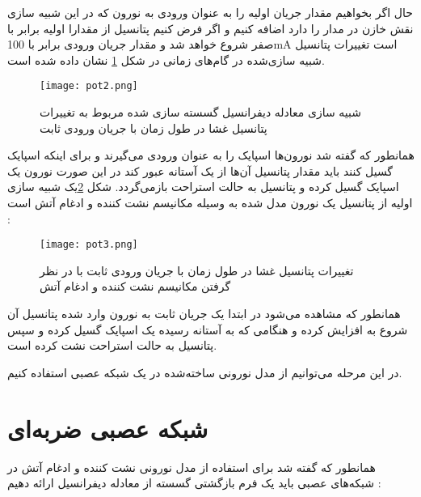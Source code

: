   حال اگر بخواهیم مقدار جریان اولیه را به عنوان ورودی به نورون که در این شبیه سازی نقش خازن در مدار را دارد اضافه کنیم و اگر فرض کنیم پتانسیل از مقدارا اولیه برابر با صفر شروع خواهد شد و مقدار جریان ورودی برابر با 100mA است تغییرات پتانسیل شبیه سازی‌شده در گام‌های زمانی در شکل \ref{fig:neuron9} نشان داده شده است.
   \begin{figure}[htbp]
  	\centering
  	\texttt{[image: pot2.png]}
  	\captionsetup{font=small} %
  	\caption{شبیه سازی معادله دیفرانسیل گسسته سازی شده مربوط به تغییرات پتانسیل غشا در طول  زمان با جریان ورودی ثابت}
  	\label{fig:neuron9}
  \end{figure}
% 
% 
% 

 همانطور که گفته شد نورون‌ها اسپایک را به عنوان ورودی می‌گیرند و برای اینکه اسپایک گسیل کنند باید مقدار پتانسیل آن‌ها از یک آستانه عبور کند در این صورت نورون یک اسپایک گسیل کرده و پتانسیل به حالت استراحت باز‌می‌گردد.
شکل \ref{fig:neuron10}یک شبیه سازی اولیه از پتانسیل یک نورون مدل شده به وسیله مکانیسم نشت کننده و ادغام آتش است :
 
  \begin{figure}[htbp]
 	\centering
 	\texttt{[image: pot3.png]}
 	\captionsetup{font=small} %
 	\caption{تغییرات پتانسیل غشا در طول  زمان با جریان ورودی ثابت با در نظر گرفتن مکانیسم نشت کننده و ادغام آتش }
 	\label{fig:neuron10}
 \end{figure}
 
 همانطور که مشاهده می‌شود در ابتدا یک جریان ثابت به نورون وارد شده پتانسیل آن شروع به افزایش کرده و هنگامی که به آستانه رسیده یک اسپایک گسیل کرده و سپس پتانسیل به حالت استراحت نشت کرده است.
 
 
 
 در این مرحله می‌توانیم از مدل نورونی ساخته‌شده در یک شبکه عصبی استفاده کنیم.
 

\section{شبکه عصبی ضربه‌ای }


همانطور که گفته شد برای استفاده از مدل نورونی نشت کننده و ادغام آتش در شبکه‌های عصبی باید یک فرم بازگشتی گسسته از معادله دیفرانسیل ارائه دهیم :

